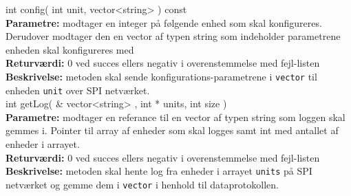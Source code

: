 int config( int unit, vector<string> ) const \\
\textbf{Parametre:} modtager en integer på følgende enhed som skal konfigureres. Derudover modtager den en vector af typen string som indeholder parametrene enheden skal konfigureres med \\
\textbf{Returværdi:}  0 ved succes ellers negativ i overenstemmelse med fejl-listen   \\
\textbf{Beskrivelse:} metoden skal sende konfigurations-parametrene i \verb+vector+ til enheden \verb+unit+ over SPI netværket.\\

int getLog( \& vector<string> , int * units, int size ) \\
\textbf{Parametre:}  modtager en referance til en vector af typen string som loggen skal gemmes i. Pointer til array af enheder som skal logges samt int med antallet af enheder i arrayet. \\
\textbf{Returværdi:}  0 ved succes ellers negativ i overenstemmelse med fejl-listen   \\
\textbf{Beskrivelse:} metoden skal hente log fra enheder i arrayet \verb+units+ på SPI netværket og gemme dem i \verb+vector+ i henhold til dataprotokollen. \\
